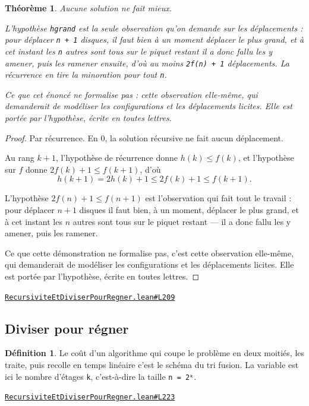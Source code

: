 \documentclass[11pt,a4paper]{article}
\theoremstyle{definition}
\newtheorem{definition}{Définition}
\theoremstyle{plain}
\newtheorem{theoreme}{Théorème}
\newcommand{\source}[2]{\par\smallskip\noindent\hfill{\footnotesize\href{#1}{\texttt{#2}}}\par\smallskip}
\begin{document}
\begin{theoreme}
Aucune solution ne fait mieux.

L'hypothèse \texttt{hgrand} est la seule observation qu'on demande sur les déplacements :
pour déplacer \texttt{n + 1} disques, il faut bien à un moment déplacer le plus grand, et à
cet instant les \texttt{n} autres sont tous sur le piquet restant \textemdash{} il a donc fallu les y
amener, puis les ramener ensuite, d'où au moins \texttt{2f(n) + 1} déplacements. La
récurrence en tire la minoration pour tout \texttt{n}.

Ce que cet énoncé ne formalise pas : cette observation elle-même, qui demanderait de
modéliser les configurations et les déplacements licites. Elle est portée par
l'hypothèse, écrite en toutes lettres.
\end{theoreme}
\begin{proof}
Par récurrence. En \(0\), la solution récursive ne fait aucun déplacement.

Au rang \(k+1\), l'hypothèse de récurrence donne \(h(k) \le f(k)\), et l'hypothèse sur
\(f\) donne \(2f(k) + 1 \le f(k+1)\), d'où
\[ h(k+1) = 2h(k) + 1 \le 2f(k) + 1 \le f(k+1) . \]

L'hypothèse \(2f(n) + 1 \le f(n+1)\) est l'observation qui fait tout le travail : pour
déplacer \(n+1\) disques il faut bien, à un moment, déplacer le plus grand, et à cet
instant les \(n\) autres sont tous sur le piquet restant — il a donc fallu les y
amener, puis les ramener.

Ce que cette démonstration ne formalise pas, c'est cette observation elle-même, qui
demanderait de modéliser les configurations et les déplacements licites. Elle est portée
par l'hypothèse, écrite en toutes lettres.
\end{proof}
\source{https://github.com/Commutator-IO/learn-lean/blob/main/courses/02-lycee/11-informatique-nsi/RecursiviteEtDiviserPourRegner.lean\#L209}{RecursiviteEtDiviserPourRegner.lean\#L209}

\subsection{Diviser pour régner}

\begin{definition}
Le coût d'un algorithme qui coupe le problème en deux moitiés, les traite, puis
recolle en temps linéaire \textemdash{} c'est le schéma du tri fusion. La variable est ici le
nombre d'étages \texttt{k}, c'est-à-dire la taille \texttt{n = 2ᵏ}.
\end{definition}
\source{https://github.com/Commutator-IO/learn-lean/blob/main/courses/02-lycee/11-informatique-nsi/RecursiviteEtDiviserPourRegner.lean\#L223}{RecursiviteEtDiviserPourRegner.lean\#L223}
\end{document}
